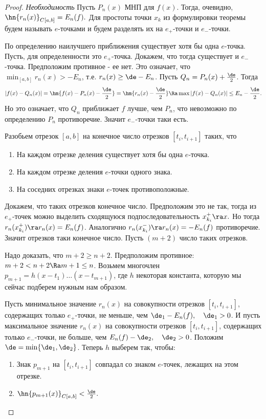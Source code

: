 \documentclass[a4paper]{article}
\begin{document}
\begin{proof}
  \emph{Необходимость}
  Пусть $P_n(x)$ МНП для $f(x)$. Тогда, очевидно,
  $\hn{r_n(x)}_{C[a,b]}=E_n(f).$ Для простоты точки $x_k$ из
  формулировки теоремы будем называть $e$-точками и будем разделять
  их на $e_+$-точки и $e_-$-точки.

  По определению наилучшего приближения существует хотя бы одна
  $e$-точка. Пусть, для определенности это $e_+$-точка. Докажем, что
  тогда существует и $e_-$-точка. Предположим противное - ее нет.
  Это означает, что $\min_{[a,b]}r_n(x)>-E_n$, т.е. $r_n(x)\ge
  \de-E_n$. Пусть $Q_n=P_n(x)+\frac{\de}2$. Тогда
  $$|f(x)-Q_n(x)|=\hm{f(x)-P_n(x)-\frac{\de}2}=\hm{r_n(x)-\frac{\de}2}\Ra
  \max|f(x)-Q_n(x)|\le E_n-\frac{\de}2.$$ Но это означает, что
  $Q_n$ приближает $f$ лучше, чем $P_n$, что невозможно по
  определению $P_n$ противоречие. Значит $e_-$-точки таки есть.

  Разобьем отрезок $[a,b]$ на конечное число отрезков
  $[t_i,t_{i+1}]$ таких, что
  \begin{enumerate}
  \item
    На каждом отрезке деления существует хотя бы одна $e$-точка.
  \item
    На каждом отрезке деления $e$-точки одного знака.
  \item
    На соседних отрезках знаки $e$-точек противоположные.
  \end{enumerate}

  Докажем, что таких отрезков конечное число. Предположим это не
  так, тогда из $e_+$-точек можно выделить сходящуюся
  подпоследовательность $x_{k_i}^+\ra x.$ Но тогда
  $r_n(x_{k_i}^+)\ra r_n(x)=E_n(f)$. Аналогично
  $r_n(x_{k_i}^-)\ra r_n(x)=-E_n(f)$ противоречие. Значит
  отрезков таки конечное число. Пусть $(m+2)$ число таких
  отрезков.

  Надо доказать, что $m+2\ge n+2$. Предположим противное:
  $m+2<n+2\Ra m+1\le n$. Возьмем многочлен
  $p_{m+1}=h(x-t_1)\dots(x-t_{m+1})$, где $h$ некоторая константа,
  которую мы сейчас подберем нужным нам образом.

  Пусть минимальное значение $r_n(x)$ на совокупности отрезков
  $[t_i,t_{i+1}]$, содержащих только $e_+$-точки, не меньше, чем
  $\de_1-E_n(f),\quad\de_1>0$. И пусть максимальное значение
  $r_n(x)$ на совокупности отрезков $[t_i,t_{i+1}]$, содержащих
  только $e_-$-точки, не больше, чем
  $E_n(f)-\de_2,\quad\de_2>0$. Положим
  $\de=\min\{\de_1,\de_2\}$. Теперь $h$ выберем так, чтобы:
  \begin{enumerate}
  \item
    Знак $p_{m+1}$ на $[t_i,t_{i+1}]$ совпадал со знаком $e$-точек,
    лежащих на этом отрезке.
  \item
    $\hn{p_{m+1}(x)}_{C[a,b]}<\frac{\de}2.$
  \end{enumerate}


\end{proof}
\end{document}
